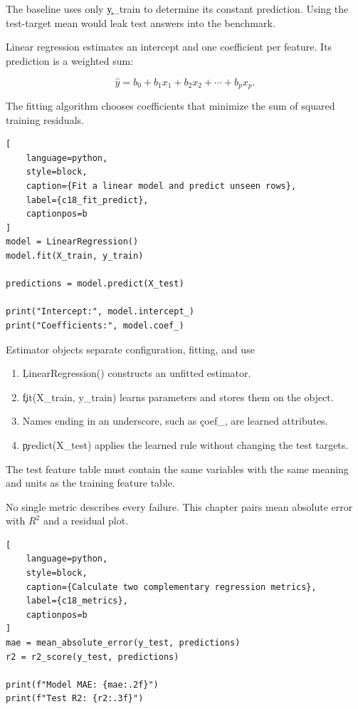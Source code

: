 The baseline uses only \c{y_train} to determine its constant prediction. Using
the test-target mean would leak test answers into the benchmark.


Linear regression estimates an intercept and one coefficient per feature. Its
prediction is a weighted sum:

\[
\hat{y} = b_0 + b_1x_1 + b_2x_2 + \cdots + b_px_p.
\]

The fitting algorithm chooses coefficients that minimize the sum of squared
training residuals.

\begin{lstlisting}[
    language=python,
    style=block,
    caption={Fit a linear model and predict unseen rows},
    label={c18_fit_predict},
    captionpos=b
]
model = LinearRegression()
model.fit(X_train, y_train)

predictions = model.predict(X_test)

print("Intercept:", model.intercept_)
print("Coefficients:", model.coef_)
\end{lstlisting}

\begin{SyntaxBox}{Estimator objects separate configuration, fitting, and use}
\begin{enumerate}
    \item \c{LinearRegression()} constructs an unfitted estimator.
    \item \c{fit(X_train, y_train)} learns parameters and stores them on the object.
    \item Names ending in an underscore, such as \c{coef_}, are learned attributes.
    \item \c{predict(X_test)} applies the learned rule without changing the test targets.
\end{enumerate}
The test feature table must contain the same variables with the same meaning
and units as the training feature table.
\end{SyntaxBox}


No single metric describes every failure. This chapter pairs mean absolute
error with $R^2$ and a residual plot.

\begin{lstlisting}[
    language=python,
    style=block,
    caption={Calculate two complementary regression metrics},
    label={c18_metrics},
    captionpos=b
]
mae = mean_absolute_error(y_test, predictions)
r2 = r2_score(y_test, predictions)

print(f"Model MAE: {mae:.2f}")
print(f"Test R2: {r2:.3f}")
\end{lstlisting}

